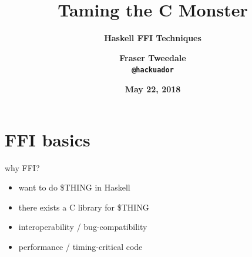 \documentclass[ignorenonframetext,aspectratio=169]{beamer}
\title{\bf Taming the C Monster}
\subtitle{\bf Haskell FFI Techniques}
\author{\bf Fraser Tweedale\\
    \texttt{@hackuador}}
\date{\bf May 22, 2018}
\providecommand{\tightlist}{%
  \setlength{\itemsep}{0pt}\setlength{\parskip}{0pt}}
\begin{document}
\begin{frame}
\titlepage
\end{frame}

\begin{frame}[plain]
\begin{center}
\end{center}
\end{frame}

\begin{frame}[plain]
\begin{center}
\end{center}
\end{frame}

\begin{frame}[plain]
\begin{center}
\end{center}
\end{frame}

\begin{frame}[plain]
\begin{center}
\end{center}
\end{frame}

\begin{frame}[plain]
\begin{center}
\end{center}
\end{frame}

\section{FFI basics}\label{ffi-basics}

\begin{frame}{why FFI?}

\begin{itemize}
\tightlist
\item
  want to do \$THING in Haskell
\item
  there exists a C library for \$THING
\item
  interoperability / bug-compatibility
\item
  performance / timing-critical code
\end{itemize}

\end{frame}
\end{document}
